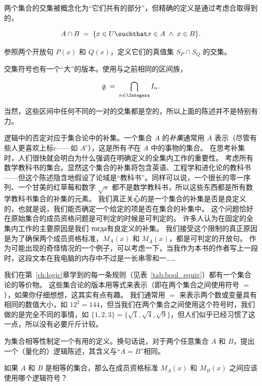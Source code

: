 两个集合的交集被概念化为“它们共有的部分”，但精确的定义是通过考虑合取得到的，

\[ A \cap B \; = \; \{ x \in U \suchthat x \in A \; \land \; x \in B \}. \]

\begin{exer} 
参照两个开放句 $P(x)$ 和 $Q(x)$，定义它们的真值集 $S_P \cap S_Q$ 的交集。
\end{exer}

交集符号也有一个“大”的版本。使用与之前相同的区间族，

\[ \mbox{\raisebox{-2pt}{$\emptyset$}} \; = \; \bigcap_{n\in\Integers} I_n. \]

当然，这些区间中任何不同的一对的交集都是空的，所以上面的陈述并不是特别有力。

逻辑中的否定对应于集合论中的补集。一个集合 $A$ 的\emph{补集}通常用 $\overline{A}$ 表示（尽管有些人更喜欢上标c——如 $A^c$），这是所有\emph{不}在 $A$ 中的事物的集合。
在思考补集时，人们很快就会明白为什么强调在明确定义的全集内工作的重要性。
考虑所有数学教科书的集合。显然这个集合的补集将包含英语、工程学和进化论的教科书——但这个陈述隐含地假设了论域是“教科书”。同样可以说，一个很长的零一序列、一个甘美的红草莓和数字 $\sqrt{\pi}$ 都不是数学教科书，所以这些东西都是所有数学教科书集合的补集的元素。
我们真正关心的是一个集合的补集是否是良定义的，也就是说，我们能否确定一个给定的项是否在集合的补集中。
这个问题恰好在原始集合的成员资格问题是可判定的时候是可判定的。
许多人认为在固定的全集内工作的主要原因是我们 тогда有良定义的补集。
我们接受这个限制的真正原因是为了确保两个成员资格标准，$M_A(x)$ 和 $M_{\overline{A}}(x)$，都是可判定的开放句。
作为可能出现的奇怪情况的一个例子，可以考虑一下，当我作为本书的作者写上一段时，这段文本在我电脑的内存中不过是一长串零和一……

我们在第~\ref{ch:logic}章学到的每一条规则（见表~\ref{tab:bool_equiv}）都有一个集合论的等价物。
这些集合论的版本用等式来表示（即在两个集合之间使用符号 $=$），如果你仔细想想，这其实有点有趣。
我们通常用 $=$ 来表示两个数或变量具有相同的数值大小，如 $12^2 = 144$，但当我们在两个集合之间使用这个符号时，我们做的是完全不同的事情，如 $\{1,2,3\}=\{\sqrt{1},\sqrt{4},\sqrt{9}\}$，但人们似乎已经习惯了这一点，所以没有必要斤斤计较。

\begin{exer}
为集合相等性制定一个有用的定义。换句话说，对于两个任意集合 $A$ 和 $B$，提出一个（量化的）逻辑陈述，其含义与“$A = B$”相同。
\end{exer}

\begin{exer}
如果 $A$ 和 $B$ 是相等的集合，那么在成员资格标准 $M_A(x)$ 和 $M_B(x)$ 之间应该使用哪个逻辑符号？
\end{exer}


